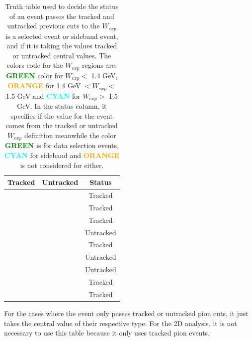 \begin{table}[!htb]
	
	\centering

	\begin{tabular}{c|c|c}
        Tracked           & Untracked         & Status \\ \hline
		\cellcolor{green} & \cellcolor{green} & \cellcolor{green} Tracked \\ \hline
		\cellcolor{green} & \cellcolor{orange} & \cellcolor{green} Tracked\\ \hline
  		\cellcolor{green} & \cellcolor{cyan} & \cellcolor{green} Tracked\\ \hline
		\cellcolor{orange} & \cellcolor{green} & \cellcolor{green} Untracked\\ \hline
  		\cellcolor{orange} & \cellcolor{orange} & \cellcolor{orange} Tracked\\ \hline
		\cellcolor{orange} & \cellcolor{cyan} & \cellcolor{cyan} Untracked\\ \hline
  		\cellcolor{cyan} & \cellcolor{green} & \cellcolor{green} Untracked\\ \hline
		\cellcolor{cyan} & \cellcolor{orange} & \cellcolor{cyan} Tracked\\ \hline
  		\cellcolor{cyan} & \cellcolor{cyan} & \cellcolor{cyan} Tracked\\ \hline
	\end{tabular}

    \caption{Truth table used to decide the status of an event passes the tracked and untracked previous cuts to the $W_{exp}$ is a selected event or sideband event, and if it is taking the values tracked or untracked central values. The colors code for the $W_{exp}$ regions are: \textbf{\textcolor{green}{GREEN}} color for $W_{exp}<$ 1.4 GeV, \textbf{\textcolor{orange}{ORANGE}} for 1.4 GeV $<W_{exp}<$ 1.5 GeV and \textbf{\textcolor{cyan}{ CYAN}} for $W_{exp}>$ 1.5 GeV. In the status column, it specifies if the value for the event comes from the tracked or untracked $W_{exp}$ definition meanwhile the color \textbf{\textcolor{green}{GREEN}} is for data selection events, \textbf{\textcolor{cyan}{CYAN}} for sideband and \textbf{\textcolor{orange}{ORANGE}} is not considered for either.}
	\label{tab:Analysis:BgStudies:SidebandTunning:WTruthTable}
\end{table}

For the cases where the event only passes tracked or untracked pion cuts, it just takes the central value of their respective type. For the 2D analysis, it is not necessary to use this table because it only uses tracked pion events. 

